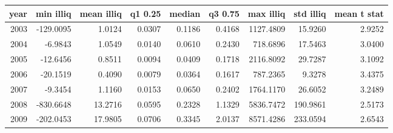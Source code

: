 \begin{tabular}{rrrrrrrrr}
\toprule
year & min illiq & mean illiq & q1 0.25 & median & q3 0.75 & max illiq & std illiq & mean t stat \\
\midrule
2003 & -129.0095 & 1.0124 & 0.0307 & 0.1186 & 0.4168 & 1127.4809 & 15.9260 & 2.9252 \\
2004 & -6.9843 & 1.0549 & 0.0140 & 0.0610 & 0.2430 & 718.6896 & 17.5463 & 3.0400 \\
2005 & -12.6456 & 0.8511 & 0.0094 & 0.0409 & 0.1718 & 2116.8092 & 29.7287 & 3.1092 \\
2006 & -20.1519 & 0.4090 & 0.0079 & 0.0364 & 0.1617 & 787.2365 & 9.3278 & 3.4375 \\
2007 & -9.3454 & 1.1160 & 0.0153 & 0.0650 & 0.2402 & 1764.1170 & 26.6052 & 3.2489 \\
2008 & -830.6648 & 13.2716 & 0.0595 & 0.2328 & 1.1329 & 5836.7472 & 190.9861 & 2.5173 \\
2009 & -202.0453 & 17.9805 & 0.0706 & 0.3345 & 2.0137 & 8571.4286 & 233.0594 & 2.6543 \\
\bottomrule
\end{tabular}
